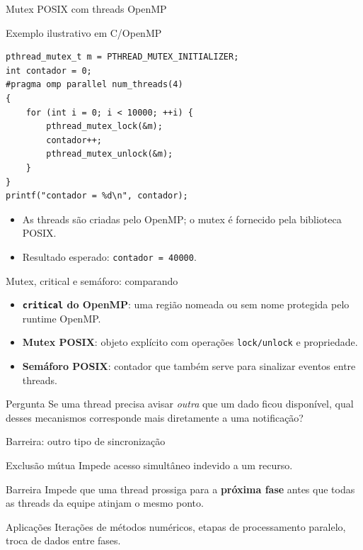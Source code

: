 \documentclass[aspectratio=169,11pt]{beamer}
\begin{document}
\begin{frame}[fragile]{Mutex POSIX com threads OpenMP}
\small
\begin{block}{Exemplo ilustrativo em C/OpenMP}
\begin{verbatim}
pthread_mutex_t m = PTHREAD_MUTEX_INITIALIZER;
int contador = 0;
#pragma omp parallel num_threads(4)
{
    for (int i = 0; i < 10000; ++i) {
        pthread_mutex_lock(&m);
        contador++;
        pthread_mutex_unlock(&m);
    }
}
printf("contador = %d\n", contador);
\end{verbatim}
\end{block}
\begin{itemize}
\item As threads são criadas pelo OpenMP; o mutex é fornecido pela biblioteca POSIX.
\item Resultado esperado: \texttt{contador = 40000}.
\end{itemize}
\end{frame}

\begin{frame}{Mutex, critical e semáforo: comparando}
\small
\begin{itemize}
\item \textbf{\texttt{critical} do OpenMP}: uma região nomeada ou sem nome protegida pelo runtime OpenMP.
\item \textbf{Mutex POSIX}: objeto explícito com operações \texttt{lock/unlock} e propriedade.
\item \textbf{Semáforo POSIX}: contador que também serve para sinalizar eventos entre threads.
\end{itemize}
\begin{block}{Pergunta}
Se uma thread precisa avisar \emph{outra} que um dado ficou disponível, qual desses mecanismos corresponde mais diretamente a uma notificação?
\end{block}
\end{frame}

\begin{frame}{Barreira: outro tipo de sincronização}
\small
\begin{block}{Exclusão mútua}
Impede acesso simultâneo indevido a um recurso.
\end{block}
\begin{block}{Barreira}
Impede que uma thread prossiga para a \textbf{próxima fase} antes que todas as threads da equipe atinjam o mesmo ponto.
\end{block}
\begin{exampleblock}{Aplicações}
Iterações de métodos numéricos, etapas de processamento paralelo, troca de dados entre fases.
\end{exampleblock}
\end{frame}
\end{document}
